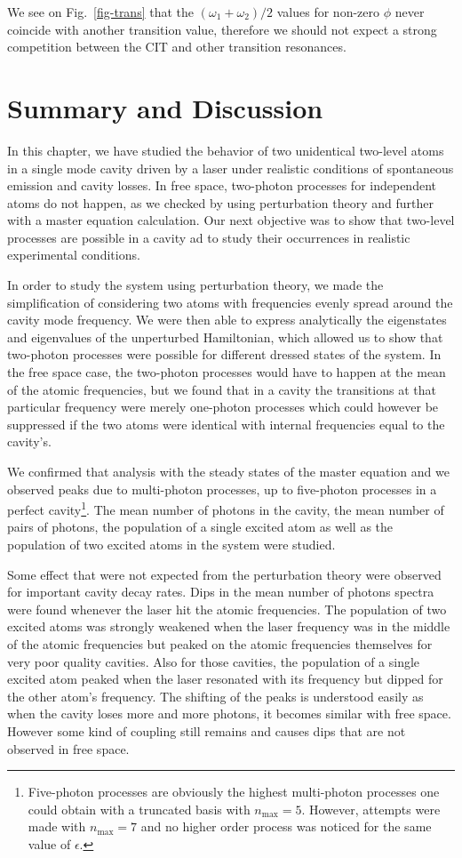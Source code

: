 We see on Fig.~\ref{fig-trans} that the $(\omega_1+\omega_2)/2$ values for non-zero $\phi$ never coincide with another transition value, therefore we should not expect a strong competition between the CIT and other transition resonances.

\section{Summary and Discussion} \label{sec-QEDconcl}

In this chapter, we have studied the behavior of two unidentical two-level atoms in a single mode cavity driven by a laser under realistic conditions of spontaneous emission and cavity losses. In free space, two-photon processes for independent atoms do not happen, as we checked by using perturbation theory and further with a master equation calculation. Our next objective was to show that two-level processes are possible in a cavity ad to study their occurrences in realistic experimental conditions.

In order to study the system using perturbation theory, we made the simplification of considering two atoms with frequencies evenly spread around the cavity mode frequency. We were then able to express analytically the eigenstates and eigenvalues of the unperturbed Hamiltonian, which allowed us to show that two-photon processes were possible for different dressed states of the system. In the free space case, the two-photon processes would have to happen at the mean of the atomic frequencies, but we found that in a cavity the transitions at that particular frequency were merely one-photon processes which could however be suppressed if the two atoms were identical with internal frequencies equal to the cavity's.

We confirmed that analysis with the steady states of the master equation and we observed peaks due to multi-photon processes, up to five-photon processes in a perfect cavity\footnote{Five-photon processes are obviously the highest multi-photon processes one could obtain with a truncated basis with $n_{\mbox{max}}=5$. However, attempts were made with $n_{\mbox{max}}=7$ and no higher order process was noticed for the same value of $\epsilon$.}. The mean number of photons in the cavity, the mean number of pairs of photons, the population of a single excited atom as well as the population of two excited atoms in the system were studied.

Some effect that were not expected from the perturbation theory were observed for important cavity decay rates. Dips in the mean number of photons spectra were found whenever the laser hit the atomic frequencies. The population of two excited atoms was strongly weakened when the laser frequency was in the middle of the atomic frequencies but peaked on the atomic frequencies themselves for very poor quality cavities. Also for those cavities,  the population of a single excited atom peaked when the laser resonated with its frequency but dipped for the other atom's frequency. The shifting of the peaks is understood easily as when the cavity loses more and more photons, it becomes similar with free space. However some kind of coupling still remains and causes dips that are not observed in free space.

